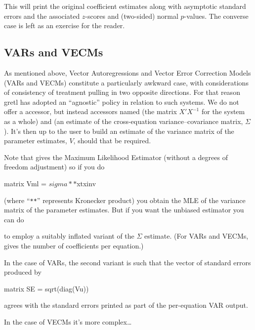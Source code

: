 This will print the original coefficient estimates along with
asymptotic standard errors and the associated
$z$-scores and (two-sided) normal $p$-values. The converse case is
left as an exercise for the reader.

\subsection{VARs and VECMs}

As mentioned above, Vector Autoregressions and Vector Error Correction
Models (VARs and VECMs) constitute a particularly awkward case, with
considerations of consistency of treatment pulling in two opposite
directions. For that reason gretl has adopted an ``agnostic'' policy
in relation to such systems. We do not offer a  accessor,
but instead accessors named  (the matrix $X'X^{-1}$ for
the system as a whole) and  (an estimate of the
cross-equation variance--covariance matrix, $\Sigma$). It's then up to
the user to build an estimate of the variance matrix of the parameter
estimates, $V$, should that be required.

Note that  gives the Maximum Likelihood Estimator
(without a degrees of freedom adjustment) so if you do
%
\begin{code}
matrix Vml = $sigma ** $xtxinv
\end{code}
%
(where ``\texttt{**}'' represents Kronecker product) you obtain the
MLE of the variance matrix of the parameter estimates. But if you want
the unbiased estimator you can do
%
%
to employ a suitably inflated variant of the $\Sigma$ estimate. (For
VARs and VECMs,  gives the number of coefficients per
equation.)

In the case of VARs, the second variant is such that the vector of
standard errors produced by
%
\begin{code}
matrix SE = sqrt(diag(Vu))
\end{code}
%
agrees with the standard errors printed as part of the per-equation
VAR output.

In the case of VECMs it's more complex\dots{}

